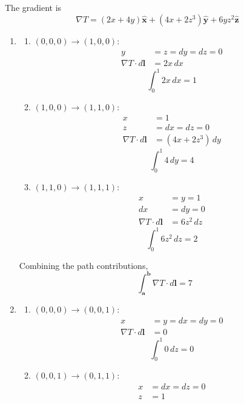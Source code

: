 \documentclass[a4paper]{article}
\begin{document}
The gradient is
\[
	\nabla T = \!\left( 2x + 4y \right)\pmb{\hat{x}} + \!\left( 4x + 2z^{3} \right)\pmb{\hat{y}} + 6yz^{2}\pmb{\hat{z}}
\]

\begin{enumerate}[label=(\alph*)]
	\item \begin{enumerate}[label=(\roman*)]
			\item \underline{\( \!\left( 0,0,0 \right) \rightarrow \!\left( 1,0,0 \right) \)}: 
				\begin{align*}
					y & = z = dy = dz = 0 \\
				 \nabla T \cdot d \pmb{l} & = 2x \, dx
			 	\end{align*}
			\[
				\int^{1}_{0} 2x \, dx = 1  
			\]
		\item \underline{\( \!\left( 1,0,0 \right) \rightarrow \!\left( 1,1,0 \right) \)}:
			\begin{align*}
				x & = 1 \\
				z & = dx = dz = 0 \\
				\nabla T \cdot d \pmb{l} & = \!\left( 4x + 2z^{3} \right) \, dy
			\end{align*}
			\[
				\int^{1}_{0} 4 \, dy = 4  
			\]
		\item \underline{\( \!\left( 1,1,0 \right) \rightarrow \!\left( 1,1,1 \right) \)}: 
		\begin{align*}
			x & = y = 1 \\
			dx & = dy = 0 \\ 
			\nabla T \cdot d \pmb{l} & = 6z^{2} \, dz
		\end{align*}
		\[
			\int^{1}_{0} 6z^{2} \, dz = 2  
		\]
	\end{enumerate}
	Combining the path contributions,
	\[
		\int^{\pmb{b}}_{\pmb{a}} \nabla T \cdot d \pmb{l} = 7  
	\]
	\item \begin{enumerate}[label=(\roman*)]
		\item \underline{\( \!\left( 0,0,0 \right) \rightarrow \!\left( 0,0,1 \right) \)}:
		\begin{align*}
			x & = y = dx = dy = 0 \\
			\nabla T \cdot d \pmb{l} & = 0
		\end{align*}
		\[
			\int^{1}_{0} 0 \, dz = 0  
		\]
		\item \underline{\( \!\left( 0,0,1 \right) \rightarrow \!\left( 0,1,1 \right) \)}:
		\begin{align*}
			x & = dx = dz = 0 \\
			z & = 1 \\ 

\end{align*}
\end{enumerate}
\end{enumerate}
\end{document}
